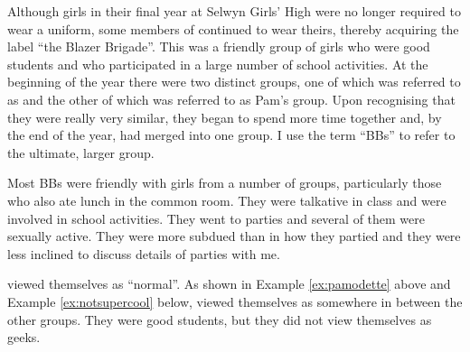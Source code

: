 \vspace{5 mm}
 
\noindent Although girls in their final year at Selwyn Girls' High were no longer required to wear a uniform, some members of  continued to wear theirs, thereby acquiring the label ``the Blazer Brigade''. This was a friendly group of girls who were good students and who participated in a large number of school activities. At the beginning of the year there were two distinct groups, one of which was referred to as  and the other of which was referred to as Pam's group. Upon recognising that they were really very similar, they began to spend more time together and, by the end of the year, had merged into one group. I use the term ``BBs'' to refer to the ultimate, larger group. 



Most BBs were friendly with girls from a number of groups, particularly those who also ate lunch in the common room. They were talkative in class and were involved in school activities. They went to parties and several of them were sexually active. They were more subdued than  in how they partied and they were less inclined to discuss details of parties with me. 

 viewed themselves as ``normal''. As shown in Example \ref{ex:pamodette} above and Example \ref{ex:notsupercool} below,  viewed themselves as somewhere in between the other groups. They were good students, but they did not view themselves as geeks.

\label{ex:notsupercool}

